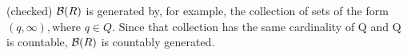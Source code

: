 (checked)
$\mathcal{B} (R)$ is generated by, for example, the collection of sets of the form $ (q, \infty), \text{where } q \in Q$. Since that collection has the same cardinality of Q and Q is countable, $\mathcal{B} (R)$ is countably generated.